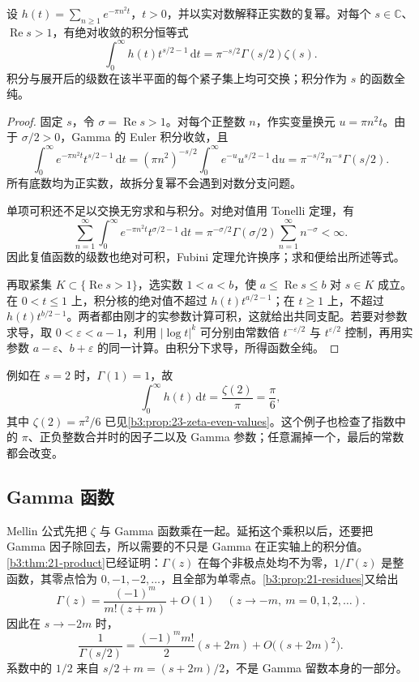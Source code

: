 \begin{proposition}\label{b3:prop:26-theta-mellin}
设 \(h(t)=\sum_{n\ge1}e^{-\pi n^2t}\)，\(t>0\)，并以实对数解释正实数的复幂。对每个 \(s\in\mathbb C\)、\(\operatorname{Re}s>1\)，有绝对收敛的积分恒等式
\begin{equation}\label{b3:eq:26-theta-mellin}
 \int_0^\infty h(t)t^{s/2-1}\,\mathrm dt
 =\pi^{-s/2}\Gamma(s/2)\zeta(s).
\end{equation}
积分与展开后的级数在该半平面的每个紧子集上均可交换；积分作为 \(s\) 的函数全纯。
\end{proposition}
\begin{proof}
固定 \(s\)，令 \(\sigma=\operatorname{Re}s>1\)。对每个正整数 \(n\)，作实变量换元 \(u=\pi n^2t\)。由于 \(\sigma/2>0\)，Gamma 的 Euler 积分收敛，且
\[
 \int_0^\infty e^{-\pi n^2t}t^{s/2-1}\,\mathrm dt
 =(\pi n^2)^{-s/2}\int_0^\infty e^{-u}u^{s/2-1}\,\mathrm du
 =\pi^{-s/2}n^{-s}\Gamma(s/2).
\]
所有底数均为正实数，故拆分复幂不会遇到对数分支问题。

单项可积还不足以交换无穷求和与积分。对绝对值用 Tonelli 定理，有
\[
 \sum_{n=1}^\infty\int_0^\infty
       e^{-\pi n^2t}t^{\sigma/2-1}\,\mathrm dt
 =\pi^{-\sigma/2}\Gamma(\sigma/2)
       \sum_{n=1}^\infty n^{-\sigma}<\infty.
\]
因此复值函数的级数也绝对可积，Fubini 定理允许换序；求和便给出所述等式。

再取紧集 \(K\subset\{\operatorname{Re}s>1\}\)，选实数 \(1<a<b\)，使 \(a\le\operatorname{Re}s\le b\) 对 \(s\in K\) 成立。在 \(0<t\le1\) 上，积分核的绝对值不超过 \(h(t)t^{a/2-1}\)；在 \(t\ge1\) 上，不超过 \(h(t)t^{b/2-1}\)。两者都由刚才的实参数计算可积，这就给出共同支配。若要对参数求导，取 \(0<\varepsilon<a-1\)，利用 \(|\log t|^k\) 可分别由常数倍 \(t^{-\varepsilon/2}\) 与 \(t^{\varepsilon/2}\) 控制，再用实参数 \(a-\varepsilon\)、\(b+\varepsilon\) 的同一计算。由积分下求导，所得函数全纯。
\end{proof}

例如在 \(s=2\) 时，\(\Gamma(1)=1\)，故
\[
 \int_0^\infty h(t)\,\mathrm dt
 =\frac{\zeta(2)}\pi=\frac\pi6,
\]
其中 \(\zeta(2)=\pi^2/6\) 已见\cref{b3:prop:23-zeta-even-values}。这个例子也检查了指数中的 \(\pi\)、正负整数合并时的因子二以及 Gamma 参数；任意漏掉一个，最后的常数都会改变。

\subsection{Gamma 函数}
\label{b3:subsec:260202}

Mellin 公式先把 \(\zeta\) 与 Gamma 函数乘在一起。延拓这个乘积以后，还要把 Gamma 因子除回去，所以需要的不只是 Gamma 在正实轴上的积分值。\cref{b3:thm:21-product}已经证明：\(\Gamma(z)\) 在每个非极点处均不为零，\(1/\Gamma(z)\) 是整函数，其零点恰为 \(0,-1,-2,\ldots\)，且全部为单零点。\cref{b3:prop:21-residues}又给出
\[
 \Gamma(z)=\frac{(-1)^m}{m!(z+m)}+O(1)
 \quad(z\to-m,\ m=0,1,2,\ldots).
\]
因此在 \(s\to-2m\) 时，
\begin{equation}\label{b3:eq:26-reciprocal-gamma-local}
 \frac1{\Gamma(s/2)}
 =\frac{(-1)^m m!}{2}(s+2m)+O\bigl((s+2m)^2\bigr).
\end{equation}
系数中的 \(1/2\) 来自 \(s/2+m=(s+2m)/2\)，不是 Gamma 留数本身的一部分。

